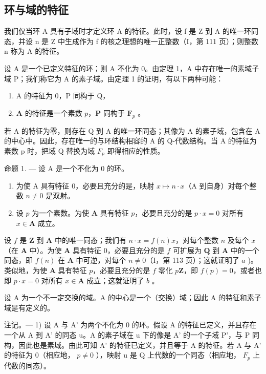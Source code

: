 \subsection{环与域的特征}

我们仅当环 A 具有子域时才定义环 A 的特征。此时，设 f 是 Z 到 A 的唯一环同态，并设 n 是 Z 中生成作为 f 的核之理想的唯一正整数（I，第 111 页）；则整数 n 称为 A 的特征。

设 A 是一个已定义特征的环；则 A 不化为 0。由定理 1，A 中存在唯一的素域子域 P；我们称它为 A 的素子域。由定理 1 的证明，有以下两种可能：

\begin{enumerate}
\def\labelenumi{\alph{enumi})}
\item
  A 的特征为 0，P 同构于 Q，
\item
  \(\mathbf{A}\) 的特征是一个素数 \(p\)，\(\mathbf{P}\) 同构于 \(\mathbf{F}_p\) 。
\end{enumerate}

若 A 的特征为零，则存在 Q 到 A 的唯一环同态；其像为 A 的素子域，包含在 A 的中心中。因此，存在唯一的与环结构相容的 A 的 Q-代数结构。当 A 的特征为素数 p 时，把域 Q 替换为域 \(F_{p}\) 即得相应的性质。

命题 1. --- 设 A 是一个不化为 0 的环。

\begin{enumerate}
\def\labelenumi{\alph{enumi})}
\item
  为使 A 具有特征 0，必要且充分的是，映射 \(x \mapsto n \cdot x\)（A 到自身）对每个整数 \(n \neq 0\) 是双射。
\item
  设 \(p\) 为一个素数。为使 \(\mathbf{A}\) 具有特征 \(p\)，必要且充分的是 \(p \cdot x = 0\) 对所有 \(x \in \mathbf{A}\) 成立。
\end{enumerate}

设 \(f\) 是 \(\mathbf{Z}\) 到 \(\mathbf{A}\) 中的唯一同态；我们有 \(n \cdot x = f(n)x\)，对每个整数 \(n\) 及每个 \(x\) （在 \(\mathbf{A}\) 中）。为使 \(\mathbf{A}\) 具有特征 0，必要且充分的是 \(f\) 可扩展为 \(\mathbf{Q}\) 到 \(\mathbf{A}\) 中的一个同态，即 \(f(n)\) 在 \(\mathbf{A}\) 中可逆，对每个 \(n \neq 0\)（I，第 113 页）；这就证明了 \(a\) )。类似地，为使 \(\mathbf{A}\) 具有特征 \(p\)，必要且充分的是 \(f\) 零化 \(p\mathbf{Z}\)，即 \(f(p) = 0\)，或者也即 \(p \cdot x = 0\) 对所有 \(x \in \mathbf{A}\) 成立；这就证明了 \(b\) 。

设 A 为一个不一定交换的域。A 的中心是一个（交换）域；因此 A 的特征和素子域是有定义的。

注记。--- 1) 设 A 与 A' 为两个不化为 0 的环。假设 A 的特征已定义，并且存在一个从 A 到 A' 的同态 u。A 的素子域在 u 下的像是 A' 的一个子域 P'，与 P 同构，因此也是素域。由此可知 A' 的特征已定义，并且等于 A 的特征。若 A 与 A' 的特征为 0（相应地， \(p \neq 0\) ），映射 u 是 Q 上代数的一个同态（相应地， \(F_{p}\) 上代数的同态）。

